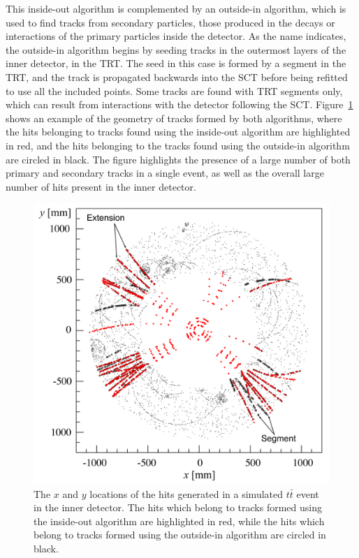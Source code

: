 This inside-out algorithm is complemented by an outside-in algorithm, which is used to find tracks from secondary particles, those produced in the decays or interactions of the primary particles inside the detector. 
As the name indicates, the outside-in algorithm begins by seeding tracks in the outermost layers of the inner detector, in the \ac{TRT}. 
The seed in this case is formed by a segment in the \ac{TRT}, and the track is propagated backwards into the \ac{SCT} before being refitted to use all the included points.
Some tracks are found with \ac{TRT} segments only, which can result from interactions with the detector following the \ac{SCT}.
Figure~\ref{fig:track_patterns} shows an example of the geometry of tracks formed by both algorithms, where the hits belonging to tracks found using the inside-out algorithm are highlighted in red, and the hits belonging to the tracks found using the outside-in algorithm are circled in black.
The figure highlights the presence of a large number of both primary and secondary tracks in a single event, as well as the overall large number of hits present in the inner detector.

\begin{figure}
\includegraphics[width=\fullfig]{figures/track_patterns.png}
\caption{The $x$ and $y$ locations of the hits generated in a simulated $t\bar{t}$ event in the inner detector. The hits which belong to tracks formed using the inside-out algorithm are highlighted in red, while the hits which belong to tracks formed using the outside-in algorithm are circled in black.}
\label{fig:track_patterns}
\end{figure}

